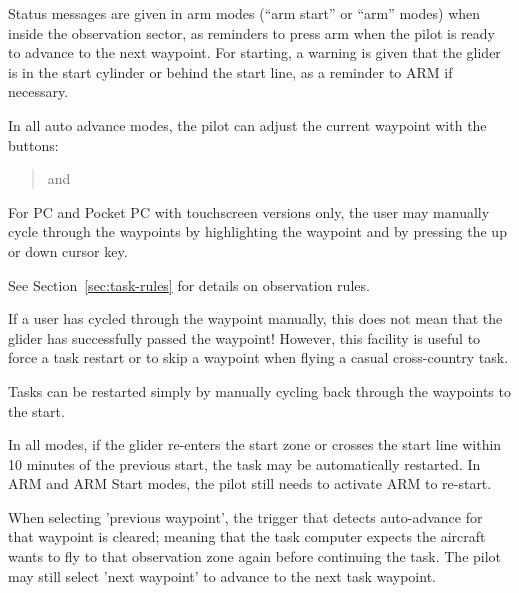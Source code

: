 \documentclass[a4paper,12pt]{refrep}
\begin{document}
Status messages are given in arm modes (``arm start'' or ``arm''
modes) when inside the observation sector, as reminders to press arm
when the pilot is ready to advance to the next waypoint.
For starting, a warning is given that the glider is in the start
cylinder or behind the start line, as a reminder to ARM if necessary.

In all auto advance modes, the pilot can adjust the current waypoint
with the buttons:

\begin{quote}
\blink{} and \blink{}
\end{quote}

For PC and Pocket PC with touchscreen versions only, the user may
manually cycle through the waypoints by highlighting the waypoint
{\InfoBox} and by pressing the up or down cursor key.

See Section~\ref{sec:task-rules} for details on observation rules.

If a user has cycled through the waypoint manually, this does not mean
that the glider has successfully passed the waypoint!  However, this
facility is useful to force a task restart or to skip a waypoint when
flying a casual cross-country task.

\tip Tasks can be restarted simply by manually cycling back through the
waypoints to the start.

In all modes, if the glider re-enters the start zone or crosses the
start line within 10 minutes of the previous start, the task may be
automatically restarted.  In ARM and ARM Start modes, the pilot still
needs to activate ARM to re-start.

When selecting 'previous waypoint', the trigger that detects
auto-advance for that waypoint is cleared; meaning that the task
computer expects the aircraft wants to fly to that observation zone
again before continuing the task.  The pilot may still select 'next
waypoint' to advance to the next task waypoint.
\end{document}
